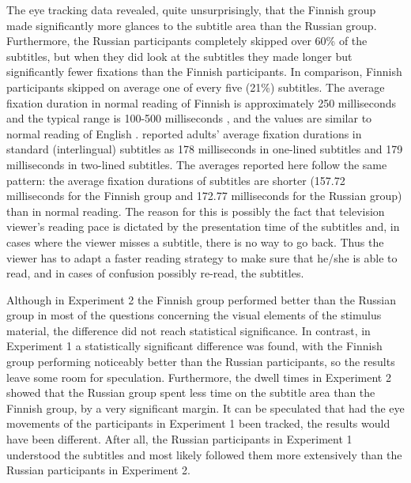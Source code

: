 \documentclass[output=paper]{langsci/langscibook}
\begin{document}
The eye tracking data revealed, quite unsurprisingly, that the Finnish group made significantly more glances to the subtitle area than the Russian group. Furthermore, the Russian participants completely skipped over 60\% of the subtitles, but when they did look at the subtitles they made longer but significantly fewer fixations than the Finnish participants. In comparison, Finnish participants skipped on average one of every five (21\%) subtitles. The average fixation duration in normal reading of Finnish is approximately 250 milliseconds and the typical range is 100-500 milliseconds \citep{hyona1996}, and the values are similar to normal reading of English \citep{Rayner1998}. \citet{Bruycker2007} reported adults' average fixation durations in standard (interlingual) subtitles as 178 milliseconds in one-lined subtitles and 179 milliseconds in two-lined subtitles. The averages reported here follow the same pattern: the average fixation durations of subtitles are shorter (157.72 milliseconds for the Finnish group and 172.77 milliseconds for the Russian group) than in normal reading. The reason for this is possibly the fact that television viewer's reading pace is dictated by the presentation time of the subtitles and, in cases where the viewer misses a subtitle, there is no way to go back. Thus the viewer has to adapt a faster reading strategy to make sure that he/she is able to read, and in cases of confusion possibly re-read, the subtitles. 

Although in Experiment 2 the Finnish group performed better than the Russian group in most of the questions concerning the visual elements of the stimulus material, the difference did not reach statistical significance. In contrast, in Experiment 1 a statistically significant difference was found, with the Finnish group performing noticeably better than the Russian participants, so the results leave some room for speculation. Furthermore, the dwell times in Experiment 2 showed that the Russian group spent less time on the subtitle area than the Finnish group, by a very significant margin. It can be speculated that had the eye movements of the participants in Experiment 1 been tracked, the results would have been different. After all, the Russian participants in Experiment 1 understood the subtitles and most likely followed them more extensively than the Russian participants in Experiment 2.
\end{document}
